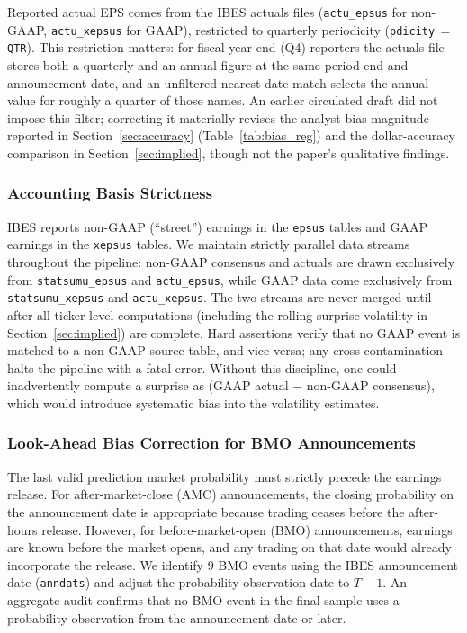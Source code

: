 \documentclass[11pt]{article}
\begin{document}
Reported actual EPS comes from the IBES actuals files (\texttt{actu\_epsus} for non-GAAP, \texttt{actu\_xepsus} for GAAP), restricted to quarterly periodicity (\texttt{pdicity}\,$=$\,\texttt{QTR}). This restriction matters: for fiscal-year-end (Q4) reporters the actuals file stores both a quarterly and an annual figure at the same period-end and announcement date, and an unfiltered nearest-date match selects the annual value for roughly a quarter of those names. An earlier circulated draft did not impose this filter; correcting it materially revises the analyst-bias magnitude reported in Section~\ref{sec:accuracy} (Table~\ref{tab:bias_reg}) and the dollar-accuracy comparison in Section~\ref{sec:implied}, though not the paper's qualitative findings.

\subsubsection{Accounting Basis Strictness}

IBES reports non-GAAP (``street'') earnings in the \texttt{epsus} tables and GAAP earnings in the \texttt{xepsus} tables. We maintain strictly parallel data streams throughout the pipeline: non-GAAP consensus and actuals are drawn exclusively from \texttt{statsumu\_epsus} and \texttt{actu\_epsus}, while GAAP data come exclusively from \texttt{statsumu\_xepsus} and \texttt{actu\_xepsus}. The two streams are never merged until after all ticker-level computations (including the rolling surprise volatility in Section~\ref{sec:implied}) are complete. Hard assertions verify that no GAAP event is matched to a non-GAAP source table, and vice versa; any cross-contamination halts the pipeline with a fatal error. Without this discipline, one could inadvertently compute a surprise as (GAAP actual $-$ non-GAAP consensus), which would introduce systematic bias into the volatility estimates.

\subsubsection{Look-Ahead Bias Correction for BMO Announcements}

The last valid prediction market probability must strictly precede the earnings release. For after-market-close (AMC) announcements, the closing probability on the announcement date is appropriate because trading ceases before the after-hours release. However, for before-market-open (BMO) announcements, earnings are known before the market opens, and any trading on that date would already incorporate the release. We identify 9 BMO events using the IBES announcement date (\texttt{anndats}) and adjust the probability observation date to $T-1$. An aggregate audit confirms that no BMO event in the final sample uses a probability observation from the announcement date or later.
\end{document}
